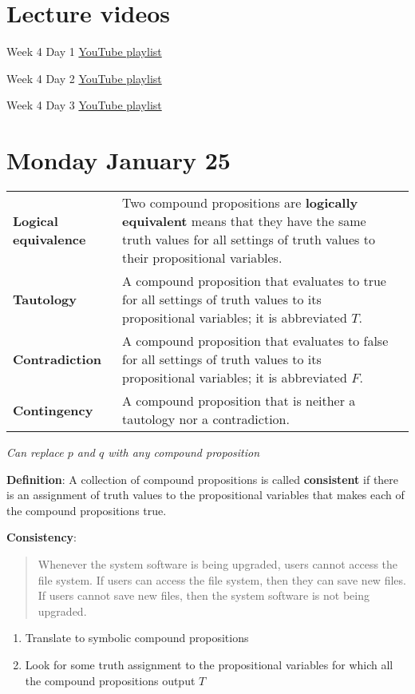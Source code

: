 \documentclass[12pt, oneside]{article}
\begin{document}
\section*{Lecture videos}
Week 4 Day 1
\href{https://youtube.com/playlist?list=PLML4QilACLk47QBNBgn3XU9VKJteswzfV}{YouTube playlist}

Week 4 Day 2
\href{https://youtube.com/playlist?list=PLML4QilACLk7ZmUbf4VXu8oUqcVmPMl4l}{YouTube playlist}

Week 4 Day 3
\href{https://youtube.com/playlist?list=PLML4QilACLk496T5XZ30JKU-t1iVaHIXm}{YouTube playlist}

\newpage
\section*{Monday January 25}
\begin{tabular}{lp{4in}p{2in}}
{\bf Logical equivalence } &Two compound  propositions are {\bf logically  equivalent} means that  they 
have the  same  truth  values for all settings of truth  values to their propositional  variables.\\
{\bf Tautology} & A compound proposition that evaluates to true
for all settings of truth  values to its propositional  variables; it is  abbreviated $T$.\\
{\bf Contradiction} & A compound proposition that  evaluates  to  false 
for  all settings of truth  values to its propositional  variables; it  is abbreviated $F$.\\
{\bf Contingency} & A compound proposition that is neither a tautology nor a contradiction.\\
\end{tabular}


{\it Can replace $p$ and $q$ with any compound proposition}


 {\bf Definition}: A collection of  compound  propositions
is called {\bf consistent} if  there
is  an assignment  of  truth values
to  the  propositional variables that makes
each of the compound propositions  true.

{\bf Consistency}: 
\begin{quote}
Whenever the system software is being upgraded, users cannot access the file system. 
If users can access the file system, then they can save new files. 
If users cannot save new files, then the system software is not being upgraded.
\end{quote}

\begin{enumerate}
\item Translate to symbolic compound propositions
\vfill
\item Look for some truth assignment to the propositional variables for which all the compound propositions output $T$
\vfill
\end{enumerate}
\end{document}
